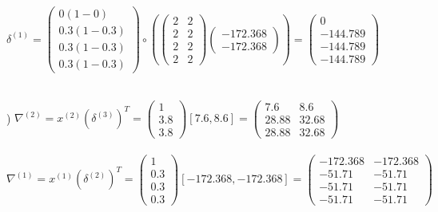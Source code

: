 \documentclass[12pt]{article}
\begin{document}
\indent $\delta^{(1)} = 
\begin{pmatrix}
0(1 - 0) \\ 0.3(1 - 0.3) \\ 0.3(1 - 0.3) \\ 0.3(1 - 0.3)
\end{pmatrix} \circ \left(
\begin{pmatrix}
2 & 2 \\
2 & 2 \\
2 & 2 \\
2 & 2 
\end{pmatrix}
\begin{pmatrix}
-172.368 \\ -172.368
\end{pmatrix}\right) = 
\begin{pmatrix}
0 \\ -144.789 \\ -144.789 \\ -144.789
\end{pmatrix}
$\\



\noindent \hrulefill \\\pagebreak



) $\nabla^{(2)} = x^{(2)}(\delta^{(3)})^T = 
\begin{pmatrix}
1\\ 3.8\\ 3.8
\end{pmatrix}
[7.6, 8.6] = 
\begin{pmatrix}
7.6 & 8.6 \\
28.88 & 32.68 \\
28.88 & 32.68
\end{pmatrix}
$\\\\

\indent $\nabla^{(1)} = x^{(1)}(\delta^{(2)})^T = 
\begin{pmatrix}
1\\ 0.3\\ 0.3 \\ 0.3
\end{pmatrix}
[-172.368, -172.368] = 
\begin{pmatrix}
-172.368 & -172.368 \\
-51.71 & -51.71 \\
-51.71 & -51.71 \\
-51.71 & -51.71 
\end{pmatrix}
$\\\\
\end{document}
